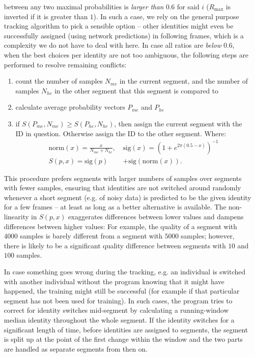 \documentclass[9pt,lineno]{elife}
\begin{document}
between any two maximal probabilities is \textit{larger than} $0.6$ for said $i$ ($R_\mathrm{max}$ is inverted if it is greater than $1$). In such a case, we rely on the general purpose tracking algorithm to pick a sensible option -- other identities might even be successfully assigned (using network predictions) in following frames, which is a complexity we do not have to deal with here. In case all ratios are \textit{below} $0.6$, when the best choices per identity are not too ambiguous, the following steps are performed to resolve remaining conflicts:

\begin{enumerate}
\item count the number of samples $N_{me}$ in the current segment, and the number of samples $N_{he}$ in the other segment that this segment is compared to
\item calculate average probability vectors $P_{me}$ and $P_{he}$
\item if $S(P_{me}, N_{me}) \ge S(P_{he}, N_{he})$, then assign the current segment with the ID in question. Otherwise assign the ID to the other segment. Where:
\begin{equation}
\begin{split}
    \mathrm{norm}(x) = \frac{x}{N_{me} + N_{he}},\ &
    \mathrm{sig}(x) = \left(1 + e^{2\pi(0.5-x)}\right)^{-1} \\
    S(p,x) = \mathrm{sig}(p) &+ \mathrm{sig}(\mathrm{norm}(x)) .
\end{split}
\end{equation}
\end{enumerate}

This procedure prefers segments with larger numbers of samples over segments with fewer samples, ensuring that identities are not switched around randomly whenever a short segment (e.g. of noisy data) is predicted to be the given identity for a few frames -- at least as long as a better alternative is available. The non-linearity in $S(p,x)$ exaggerates differences between lower values and dampens differences between higher values: For example, the quality of a segment with $4000$ samples is barely different from a segment with $5000$ samples; however, there is likely to be a significant quality difference between segments with $10$ and $100$ samples.

In case something goes wrong during the tracking, e.g. an individual is switched with another individual without the program knowing that it might have happened, the training might still be successful (for example if that particular segment has not been used for training). In such cases, the program tries to correct for identity switches mid-segment by calculating a running-window median identity throughout the whole segment. If the identity switches for a significant length of time, before identities are assigned to segments, the segment is split up at the point of the first change within the window and the two parts are handled as separate segments from then on.
\end{document}
